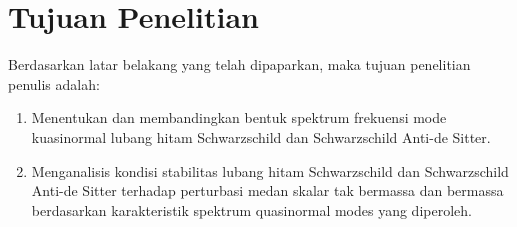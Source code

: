 \section{Tujuan Penelitian}

Berdasarkan latar belakang yang telah dipaparkan, maka tujuan penelitian penulis adalah:
\begin{enumerate}
    \item Menentukan dan membandingkan bentuk spektrum frekuensi mode kuasinormal lubang hitam Schwarzschild dan Schwarzschild Anti-de Sitter.
    \item Menganalisis kondisi stabilitas lubang hitam Schwarzschild dan Schwarzschild Anti-de Sitter terhadap perturbasi medan skalar tak bermassa dan bermassa berdasarkan karakteristik spektrum quasinormal modes yang diperoleh.
\end{enumerate}